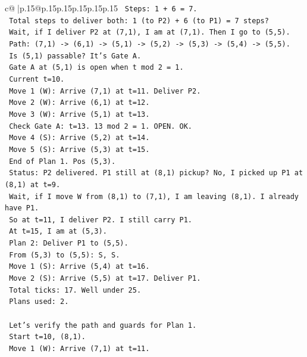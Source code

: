 \documentclass{article}
\begin{document}
{\begin{supertabular}{c@{$\;$}|p{.15\linewidth}@{}p{.15\linewidth}p{.15\linewidth}p{.15\linewidth}p{.15\linewidth}p{.15\linewidth}}
{{{\texttt{   Steps: 1 + 6 = 7.} \\
\texttt{   Total steps to deliver both: 1 (to P2) + 6 (to P1) = 7 steps?} \\
\texttt{   Wait, if I deliver P2 at (7,1), I am at (7,1). Then I go to (5,5).} \\
\texttt{   Path: (7,1) {-}> (6,1) {-}> (5,1) {-}> (5,2) {-}> (5,3) {-}> (5,4) {-}> (5,5).} \\
\texttt{   Is (5,1) passable? It's Gate A.} \\
\texttt{   Gate A at (5,1) is open when t mod 2 = 1.} \\
\texttt{   Current t=10.} \\
\texttt{   Move 1 (W): Arrive (7,1) at t=11. Deliver P2.} \\
\texttt{   Move 2 (W): Arrive (6,1) at t=12.} \\
\texttt{   Move 3 (W): Arrive (5,1) at t=13.} \\
\texttt{     Check Gate A: t=13. 13 mod 2 = 1. OPEN. OK.} \\
\texttt{   Move 4 (S): Arrive (5,2) at t=14.} \\
\texttt{   Move 5 (S): Arrive (5,3) at t=15.} \\
\texttt{   End of Plan 1. Pos (5,3).} \\
\texttt{   Status: P2 delivered. P1 still at (8,1) pickup? No, I picked up P1 at (8,1) at t=9.} \\
\texttt{   Wait, if I move W from (8,1) to (7,1), I am leaving (8,1). I already have P1.} \\
\texttt{   So at t=11, I deliver P2. I still carry P1.} \\
\texttt{   At t=15, I am at (5,3).} \\
\texttt{   Plan 2: Deliver P1 to (5,5).} \\
\texttt{   From (5,3) to (5,5): S, S.} \\
\texttt{   Move 1 (S): Arrive (5,4) at t=16.} \\
\texttt{   Move 2 (S): Arrive (5,5) at t=17. Deliver P1.} \\
\texttt{   Total ticks: 17. Well under 25.} \\
\texttt{   Plans used: 2.} \\
\\ 
\texttt{   Let's verify the path and guards for Plan 1.} \\
\texttt{   Start t=10, (8,1).} \\
\texttt{   Move 1 (W): Arrive (7,1) at t=11.} \\
}}}
\end{supertabular}}
\end{document}
